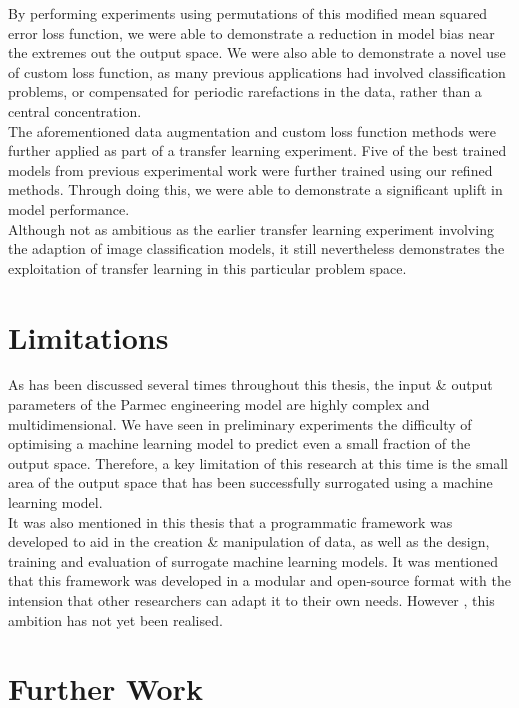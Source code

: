 \noindent
By performing experiments using permutations of this modified mean squared error loss function, we were able to demonstrate a reduction in model bias near the extremes out the output space. We were also able to demonstrate a novel use of custom loss function, as many previous applications had involved classification problems, or compensated for periodic rarefactions in the data, rather than a central concentration. \\

\noindent
The aforementioned data augmentation and custom loss function methods were further applied as part of a transfer learning experiment. Five of the best trained models from previous experimental work were further trained using our refined methods. Through doing this, we were able to demonstrate a significant uplift in model performance. \\

\noindent
Although not as ambitious as the earlier transfer learning experiment involving the adaption of image classification models, it still nevertheless demonstrates the exploitation of transfer learning in this particular problem space. 
 
 \section{Limitations}
 
 As has been discussed several times throughout this thesis, the input \& output parameters of the Parmec engineering model are highly complex and multidimensional. We have seen in preliminary experiments the difficulty of optimising a machine learning model to predict even a small fraction of the output space. Therefore, a key limitation of this research at this time is the small area of the output space that has been successfully surrogated using a machine learning model. \\
 
 \noindent
 It was also mentioned in this thesis that a programmatic framework was developed to aid in the creation \& manipulation of data, as well as the design, training and evaluation of surrogate machine learning models. It was mentioned that this framework was developed in a modular and open-source  format with the intension that other researchers can adapt it to their own needs. However , this ambition has not yet been realised.

\section{Further Work}





